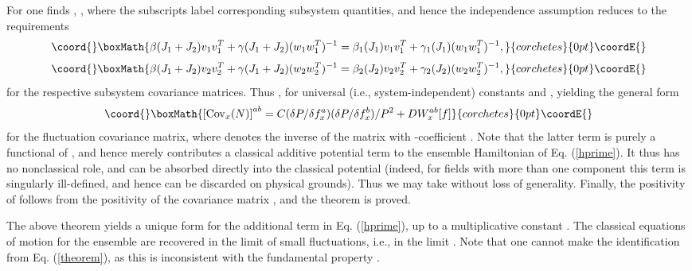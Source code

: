 \documentclass[a4paper,preprint, showpacs, aps, draft]{revtex4}
\begin{document}
{For \coordHE{} one finds \coordHE{}, \coordHE{}, where the
subscripts label corresponding subsystem quantities, and hence the
independence assumption reduces to the requirements
\[\coord{}\boxMath{
\beta(J_1+J_2)v_1v_1^T + \gamma(J_1+J_2)(w_1w_1^T)^{-1} = 
\beta_1(J_1)v_1v_1^T + \gamma_1(J_1)(w_1w_1^T)^{-1}, }{corchetes}{0pt}\coordE{}\]
\[\coord{}\boxMath{
\beta(J_1+J_2)v_2v_2^T + \gamma(J_1+J_2)(w_2w_2^T)^{-1} =
\beta_2(J_2)v_2v_2^T + \gamma_2(J_2)(w_2w_2^T)^{-1} ,}{corchetes}{0pt}\coordE{}\] 
for the respective subsystem covariance matrices.
Thus \coordHE{}, \coordHE{} for 
universal (i.e., system-independent) 
constants \coordHE{} and \coordHE{}, yielding the general form
\[\coord{}\boxMath{
\left[{\rm Cov}_x(N)\right]^{ab} = C (\delta P/\delta f^a_x) (\delta
P/\delta f^b_x)/P^2 + D W^{ab}_x[f] }{corchetes}{0pt}\coordE{}\]
for the fluctuation covariance matrix, where \coordHE{} denotes the inverse of
the matrix with \coordHE{}-coefficient \coordHE{}. Note that
the latter term is
purely a functional of \coordHE{}, and hence merely contributes a classical
additive potential term to the ensemble Hamiltonian of Eq. (\ref{hprime}).  It
thus has no nonclassical role, and can be absorbed directly into the
classical potential \coordHE{} (indeed, for fields with more than one
component this term is singularly ill-defined, and hence can be
discarded on physical grounds).  Thus we may take \coordHE{} without loss of
generality. Finally, the positivity of \coordHE{} follows from the positivity
of the covariance matrix \coordHE{}, and the theorem is proved. 
\myHighlight{$\diamondsuit$}\coordHE{} 

The above theorem yields a unique form for the additional term in Eq.
(\ref{hprime}), up to a multiplicative constant \coordHE{}.  The classical
equations of motion for the ensemble are recovered in the limit of small
fluctuations, i.e., in the limit
\coordHE{}.  Note that one cannot make the identification 
\coordHE{} from Eq. (\ref{theorem}),
as this is inconsistent with the fundamental property
\coordHE{}.

}
\end{document}
